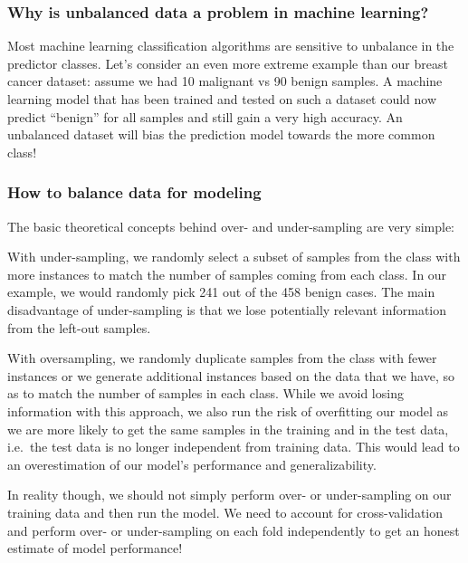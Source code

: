 \documentclass[]{book}
\begin{document}
\hypertarget{why-is-unbalanced-data-a-problem-in-machine-learning}{%
\subsubsection{Why is unbalanced data a problem in machine learning?}\label{why-is-unbalanced-data-a-problem-in-machine-learning}}

Most machine learning classification algorithms are sensitive to unbalance in the predictor classes. Let's consider an even more extreme example than our breast cancer dataset: assume we had 10 malignant vs 90 benign samples. A machine learning model that has been trained and tested on such a dataset could now predict ``benign'' for all samples and still gain a very high accuracy. An unbalanced dataset will bias the prediction model towards the more common class!

\hypertarget{how-to-balance-data-for-modeling}{%
\subsubsection{How to balance data for modeling}\label{how-to-balance-data-for-modeling}}

The basic theoretical concepts behind over- and under-sampling are very simple:

With under-sampling, we randomly select a subset of samples from the class with more instances to match the number of samples coming from each class. In our example, we would randomly pick 241 out of the 458 benign cases. The main disadvantage of under-sampling is that we lose potentially relevant information from the left-out samples.

With oversampling, we randomly duplicate samples from the class with fewer instances or we generate additional instances based on the data that we have, so as to match the number of samples in each class. While we avoid losing information with this approach, we also run the risk of overfitting our model as we are more likely to get the same samples in the training and in the test data, i.e.~the test data is no longer independent from training data. This would lead to an overestimation of our model's performance and generalizability.

In reality though, we should not simply perform over- or under-sampling on our training data and then run the model. We need to account for cross-validation and perform over- or under-sampling on each fold independently to get an honest estimate of model performance!
\end{document}
